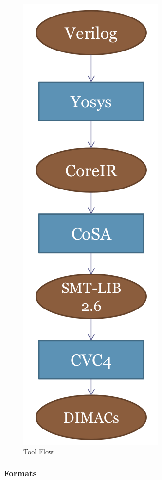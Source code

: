 \documentclass[letterpaper]{article} %
\begin{document}
\begin{figure}
\begin{center}
  \includegraphics[scale=0.2]{flow.png}
  \caption{Tool Flow}
  \label{toolflow}
\end{center}
\end{figure}

\subsubsection{Formats}
\end{document}
